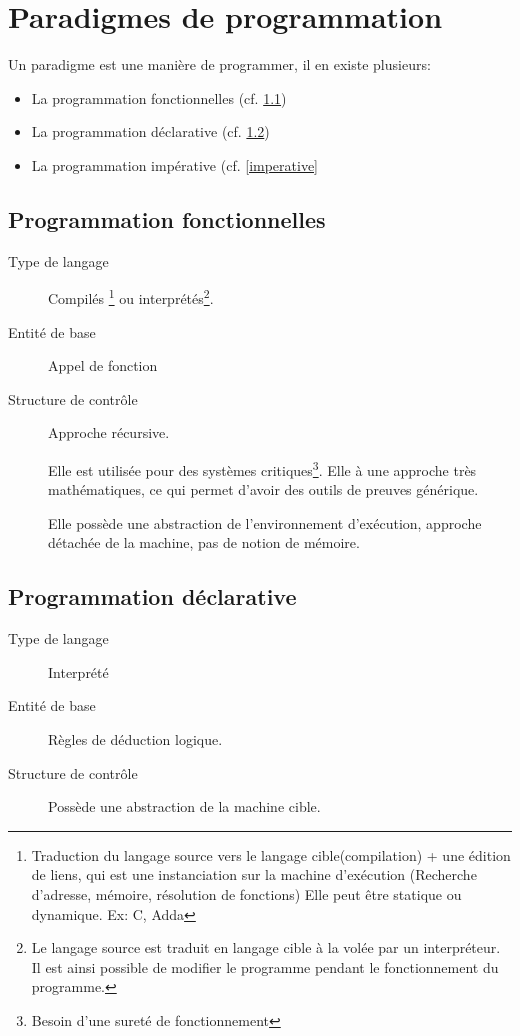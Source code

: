 \chapter{Paradigmes de programmation}
\minitoc
	Un paradigme est une manière de programmer, il en existe plusieurs: 
	\begin{itemize}
		\item La programmation fonctionnelles (cf. \ref{fonctionnelles})
		\item La programmation déclarative (cf. \ref{declarative})
		\item La programmation impérative (cf. \ref{imperative}
	\end{itemize}
	\section{Programmation fonctionnelles} \label{fonctionnelles}
	\begin{description}
	\item[Type de langage] Compilés \footnote{Traduction du langage source vers le langage cible(compilation) + une édition de liens, qui est une instanciation sur la machine d'exécution (Recherche d'adresse, mémoire, résolution de fonctions) Elle peut être statique ou dynamique. Ex: C, Adda} ou interprétés\footnote{
	Le langage source est traduit en langage cible à la volée par un interpréteur. Il est ainsi possible de modifier le programme pendant le fonctionnement du programme.}. 
	\item[Entité de base] Appel de fonction
	\item[Structure de contrôle] Approche récursive. 


	Elle est utilisée pour des systèmes critiques\footnote{Besoin d'une sureté de fonctionnement}. Elle à une approche très mathématiques, ce qui 
	permet d'avoir des outils de preuves générique.

	Elle possède une abstraction de l'environnement d'exécution, approche détachée de la machine, pas de notion de mémoire.

\end{description}
\section{Programmation déclarative} \label{declarative}
	\begin{description}
		\item[Type de langage] Interprété
		\item[Entité de base] Règles de déduction logique.
		\item[Structure de contrôle  ]
		Possède une abstraction de la machine cible.
	\end{description}
